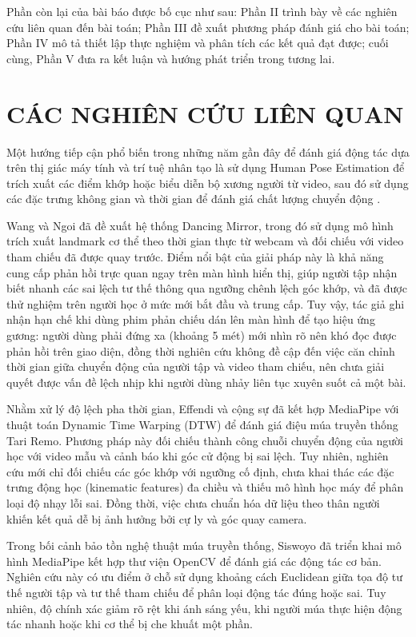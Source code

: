 \documentclass[10pt,conference,a4paper]{IEEEtran}
\begin{document}
Phần còn lại của bài báo được bố cục như sau: Phần II trình bày về các nghiên cứu liên quan đến bài toán; Phần III đề xuất phương pháp đánh giá cho bài toán; Phần IV mô tả thiết lập thực nghiệm và phân tích các kết quả đạt được; cuối cùng, Phần V đưa ra kết luận và hướng phát triển trong tương lai.

\section{CÁC NGHIÊN CỨU LIÊN QUAN}
\label{Sec:BaiBaoLienQuan}

Một hướng tiếp cận phổ biến trong những năm gần đây để đánh giá động tác dựa trên thị giác máy tính và trí tuệ nhân tạo là sử dụng Human Pose Estimation để trích xuất các điểm khớp hoặc biểu diễn bộ xương người từ video, sau đó sử dụng các đặc trưng không gian và thời gian để đánh giá chất lượng chuyển động \cite{THARATIPYAKUL2024e36589}.

Wang và Ngoi \cite{wang2023dance} đã đề xuất hệ thống Dancing Mirror, trong đó sử dụng mô hình trích xuất landmark cơ thể theo thời gian thực từ webcam và đối chiếu với video tham chiếu đã được quay trước. Điểm nổi bật của giải pháp này là khả năng cung cấp phản hồi trực quan ngay trên màn hình hiển thị, giúp người tập nhận biết nhanh các sai lệch tư thế thông qua ngưỡng chênh lệch góc khớp, và đã được thử nghiệm trên người học ở mức mới bắt đầu và trung cấp. Tuy vậy, tác giả ghi nhận hạn chế khi dùng phim phản chiếu dán lên màn hình để tạo hiệu ứng gương: người dùng phải đứng xa (khoảng 5 mét) mới nhìn rõ nên khó đọc được phản hồi trên giao diện, đồng thời nghiên cứu không đề cập đến việc căn chỉnh thời gian giữa chuyển động của người tập và video tham chiếu, nên chưa giải quyết được vấn đề lệch nhịp khi người dùng nhảy liên tục xuyên suốt cả một bài.


Nhằm xử lý độ lệch pha thời gian, Effendi và cộng sự \cite{effendi2023} đã kết hợp MediaPipe với thuật toán Dynamic Time Warping (DTW) để đánh giá điệu múa truyền thống Tari Remo. Phương pháp này đối chiếu thành công chuỗi chuyển động của người học với video mẫu và cảnh báo khi góc cử động bị sai lệch. Tuy nhiên, nghiên cứu mới chỉ đối chiếu các góc khớp với ngưỡng cố định, chưa khai thác các đặc trưng động học (kinematic features) đa chiều và thiếu mô hình học máy để phân loại độ nhạy lỗi sai. Đồng thời, việc chưa chuẩn hóa dữ liệu theo thân người khiến kết quả dễ bị ảnh hưởng bởi cự ly và góc quay camera.

Trong bối cảnh bảo tồn nghệ thuật múa truyền thống, Siswoyo \cite{siswoyo2026} đã triển khai mô hình MediaPipe kết hợp thư viện OpenCV để đánh giá các động tác cơ bản. Nghiên cứu này có ưu điểm ở chỗ sử dụng khoảng cách Euclidean giữa tọa độ tư thế người tập và tư thế tham chiếu để phân loại động tác đúng hoặc sai. Tuy nhiên, độ chính xác giảm rõ rệt khi ánh sáng yếu, khi người múa thực hiện động tác nhanh hoặc khi cơ thể bị che khuất một phần.
\end{document}
